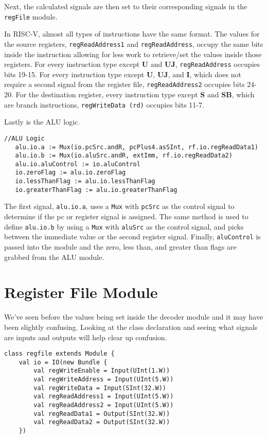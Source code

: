 \documentclass[12pt, letterpaper]{report}
\begin{document}
\noindent Next, the calculated signals are then set to their corresponding signals in the \verb|regFile| module.

In RISC-V, almost all types of instructions have the same format.
The values for the source registers, \verb|regReadAddress1| and \verb|regReadAddress|, occupy the same bits inside the instruction allowing for less work to retrieve/set the values inside those registers.
For every instruction type except \textbf{U} and \textbf{UJ}, \verb|regReadAddress| occupies bits 19-15.
For every instruction type except \textbf{U}, \textbf{UJ}, and \textbf{I}, which does not require a second signal from the register file, \verb|regReadAddress2| occupies bits 24-20.
For the destination register, every instruction type except \textbf{S} and \textbf{SB}, which are branch instructions, \verb|regWriteData (rd)| occupies bits 11-7.

Lastly is the ALU logic. 

\begin{lstlisting}[style=scala]
   //ALU Logic
   alu.io.a := Mux(io.pcSrc.andR, pcPlus4.asSInt, rf.io.regReadData1)
   alu.io.b := Mux(io.aluSrc.andR, extImm, rf.io.regReadData2)
   alu.io.aluControl := io.aluControl
   io.zeroFlag := alu.io.zeroFlag
   io.lessThanFlag := alu.io.lessThanFlag
   io.greaterThanFlag := alu.io.greaterThanFlag
\end{lstlisting}

\noindent The first signal, \verb|alu.io.a|, uses a \verb|Mux| with \verb|pcSrc| as the control signal to determine if the pc or register signal is assigned. The same method is used to define \verb|alu.io.b| by using a \verb|Mux| with \verb|aluSrc| as the control signal, and picks between the immediate value or the second register signal. Finally, \verb|aluControl| is passed into the module and the zero, less than, and greater than flags are grabbed from the ALU module.

\pagebreak
\section{Register File Module}
We've seen before the values being set inside the decoder module and it may have been slightly confusing.
Looking at the class declaration and seeing what signals are inputs and outputs will help clear up confusion.


\begin{lstlisting}[style=scala]
   class regfile extends Module {
    val io = IO(new Bundle {
        val regWriteEnable = Input(UInt(1.W))
        val regWriteAddress = Input(UInt(5.W))
        val regWriteData = Input(SInt(32.W))
        val regReadAddress1 = Input(UInt(5.W))
        val regReadAddress2 = Input(UInt(5.W))
        val regReadData1 = Output(SInt(32.W))
        val regReadData2 = Output(SInt(32.W))
    })
\end{lstlisting}
\end{document}
